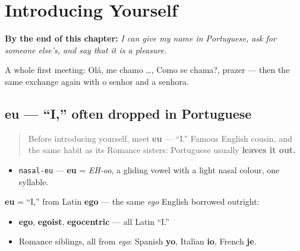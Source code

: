 
\chapter{Introducing Yourself}
\label{ch:pt-introductions}

\begin{chapteropening}
\textbf{By the end of this chapter:} \emph{I can give my name in Portuguese, ask for someone else's, and say that it is a pleasure.}

A whole first meeting: Olá, me chamo …, Como se chama?, prazer — then the same exchange again with o senhor and a senhora.
\end{chapteropening}

\section[eu]{eu — “I,” often dropped in Portuguese}

\label{lesson:PT-C03-eu}



\begin{quote}
Before introducing yourself, meet \textbf{eu} — \textquotedblleft{}I.\textquotedblright{} Famous English cousin, and the same habit as its Romance sisters: Portuguese usually \textbf{leaves it out.}
\end{quote}

\begin{sounds}
\begin{itemize}
\raggedright
  \item \texttt{nasal-eu} — \textbf{eu} = \emph{EH-oo}, a gliding vowel with a light nasal colour, one syllable.
\end{itemize}
\end{sounds}

\begin{cousinweb}
\textbf{eu} = \textquotedblleft{}I,\textquotedblright{} from Latin \textbf{ego} — the same \emph{ego} English borrowed outright:

\begin{itemize}
\raggedright
  \item \textbf{ego}, \textbf{egoist}, \textbf{egocentric} — all Latin \textquotedblleft{}I.\textquotedblright{}
  \item Romance siblings, all from \emph{ego}: Spanish \textbf{yo}, Italian \textbf{io}, French \textbf{je}.
\end{itemize}
\end{cousinweb}

